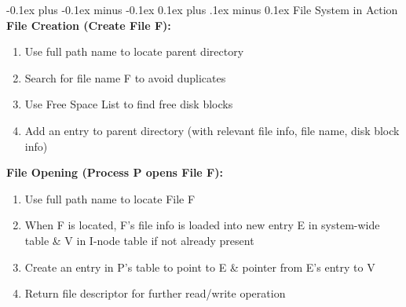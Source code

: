 \documentclass[landscape]{article}
\makeatletter
\renewcommand{\subsection}{\@startsection{subsection}{2}{0mm}%
  {-0.1ex plus -0.1ex minus -0.1ex}%
  {0.1ex plus .1ex minus 0.1ex}%
{\normalfont\scriptsize\bfseries}}
\makeatother
\begin{document}
\begin{multicols*}{6}
    \subsection{File System in Action}
    \textbf{File Creation (Create File F):}
    \begin{enumerate}
      \item Use full path name to locate parent directory
      \item Search for file name F to avoid duplicates
      \item Use Free Space List to find free disk blocks
      \item Add an entry to parent directory (with relevant file info, file name, disk block info)
    \end{enumerate}
    \textbf{File Opening (Process P opens File F):}
    \begin{enumerate}
      \item Use full path name to locate File F
      \item When F is located, F's file info is loaded into new entry E in system-wide table \& V in I-node table if not already present
      \item Create an entry in P's table to point to E \& pointer from E's entry to V
      \item Return file descriptor for further read/write operation
    \end{enumerate}
  \end{multicols*}
\end{document}
